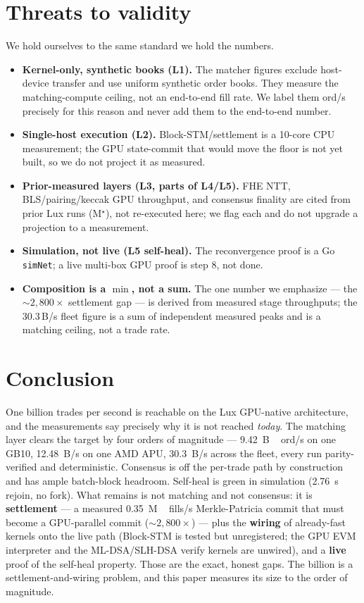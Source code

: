 \documentclass[11pt,a4paper]{article}
\newcommand{\Mprior}{M$^\star$}                          %
\begin{document}
\section{Threats to validity}

We hold ourselves to the same standard we hold the numbers.
\begin{itemize}[leftmargin=2em,itemsep=1pt]
  \item \textbf{Kernel-only, synthetic books (L1).} The matcher figures
        exclude host-device transfer and use uniform synthetic order
        books. They measure the matching-compute ceiling, not an
        end-to-end fill rate. We label them ord/s precisely for this
        reason and never add them to the end-to-end number.
  \item \textbf{Single-host execution (L2).} Block-STM/settlement is a
        10-core CPU measurement; the GPU state-commit that would move the
        floor is not yet built, so we do not project it as measured.
  \item \textbf{Prior-measured layers (L3, parts of L4/L5).} FHE NTT,
        BLS/pairing/keccak GPU throughput, and consensus finality are
        cited from prior Lux runs (\Mprior), not re-executed here; we
        flag each and do not upgrade a projection to a measurement.
  \item \textbf{Simulation, not live (L5 self-heal).} The reconvergence
        proof is a Go \texttt{simNet}; a live multi-box GPU proof is
        step 8, not done.
  \item \textbf{Composition is a $\min$, not a sum.} The one number we
        emphasize --- the $\sim 2{,}800\times$ settlement gap --- is
        derived from measured stage throughputs; the $30.3$\,B/s fleet
        figure is a sum of independent measured peaks and is a matching
        ceiling, not a trade rate.
\end{itemize}

\section{Conclusion}

One billion trades per second is reachable on the Lux GPU-native
architecture, and the measurements say precisely why it is not reached
\emph{today}. The matching layer clears the target by four orders of
magnitude --- \SI{9.42}{B\,ord/s} on one GB10, \SI{12.48}{B}/s on one
AMD APU, \SI{30.3}{B}/s across the fleet, every run parity-verified and
deterministic. Consensus is off the per-trade path by construction and
has ample batch-block headroom. Self-heal is green in simulation
(\SI{2.76}{s} rejoin, no fork). What remains is not matching and not
consensus: it is \textbf{settlement} --- a measured \SI{0.35}{M\,fills/s}
Merkle-Patricia commit that must become a GPU-parallel commit
(${\sim}2{,}800\times$) --- plus the \textbf{wiring} of already-fast
kernels onto the live path (Block-STM is tested but unregistered; the
GPU EVM interpreter and the ML-DSA/SLH-DSA verify kernels are unwired),
and a \textbf{live} proof of the self-heal property. Those are the exact,
honest gaps. The billion is a settlement-and-wiring problem, and this
paper measures its size to the order of magnitude.



\end{document}
